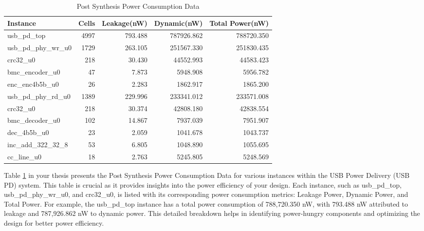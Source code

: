 \begin{table}[H]
\centering
\caption{Post Synthesis Power Consumption Data}
\begin{tabular}{|l|r|r|r|r|}
\hline
\textbf{Instance} & \textbf{Cells} & \textbf{Leakage(nW)} & \textbf{Dynamic(nW)} & \textbf{Total Power(nW)} \\ \hline
usb\_pd\_top & 4997 & 793.488 & 787926.862 & 788720.350 \\ \hline
\quad usb\_pd\_phy\_wr\_u0 & 1729 & 263.105 & 251567.330 & 251830.435 \\ \hline
\quad \quad crc32\_u0 & 218 & 30.430 & 44552.993 & 44583.423 \\ \hline
\quad \quad bmc\_encoder\_u0 & 47 & 7.873 & 5948.908 & 5956.782 \\ \hline
\quad \quad enc\_enc4b5b\_u0 & 26 & 2.283 & 1862.917 & 1865.200 \\ \hline
\quad usb\_pd\_phy\_rd\_u0 & 1389 & 229.996 & 233341.012 & 233571.008 \\ \hline
\quad \quad crc32\_u0 & 218 & 30.374 & 42808.180 & 42838.554 \\ \hline
\quad \quad bmc\_decoder\_u0 & 102 & 14.867 & 7937.039 & 7951.907 \\ \hline
\quad \quad dec\_4b5b\_u0 & 23 & 2.059 & 1041.678 & 1043.737 \\ \hline
inc\_add\_322\_32\_8 & 53 & 6.805 & 1048.890 & 1055.695 \\ \hline
cc\_line\_u0 & 18 & 2.763 & 5245.805 & 5248.569 \\ \hline
\end{tabular}
\label{table:power_syn}
\end{table}

Table \ref{table:power_syn} in your thesis presents the Post Synthesis Power Consumption Data for various instances within the USB Power Delivery (USB PD) system. This table is crucial as it provides insights into the power efficiency of your design. Each instance, such as usb\_pd\_top, usb\_pd\_phy\_wr\_u0, and crc32\_u0, is listed with its corresponding power consumption metrics: Leakage Power, Dynamic Power, and Total Power. For example, the usb\_pd\_top instance has a total power consumption of 788,720.350 nW, with 793.488 nW attributed to leakage and 787,926.862 nW to dynamic power. This detailed breakdown helps in identifying power-hungry components and optimizing the design for better power efficiency.


